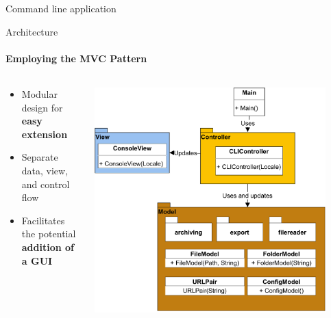 \documentclass[
    ngerman,%
    authorontitle=true,
]{bfhbeamer}
\begin{document}
\begin{frame}{Command line application}
    \end{frame}

	\begin{frame}{Architecture}
		\framesubtitle{Employing the \textbf{MVC} Pattern}
		
		\begin{columns} %
			\begin{column}{0.5\textwidth} %
				\begin{itemize}
					\item Modular design for \textbf{easy extension}
					\item Separate data, view, and control flow
					\item Facilitates the potential \textbf{addition of a GUI}
				\end{itemize}
			\end{column}
			
			\begin{column}{0.5\textwidth} %
				\begin{center}
					\includegraphics[width=0.9\textwidth]{pictures/final_presentation/mvc_diagram-Highlevel_MV_Presentation.pdf}
				\end{center}
			\end{column}
		\end{columns} %
	\end{frame}
\end{document}

